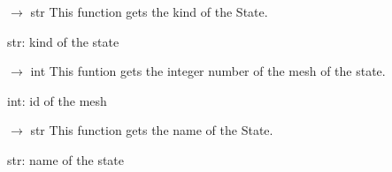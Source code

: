 \documentclass[letterpaper,10pt,english]{sphinxmanual}
\begin{document}
\begin{fulllineitems}
\begin{fulllineitems}
\begin{description}
\end{description}

\end{fulllineitems}


\begin{fulllineitems}
\label{\detokenize{scrimp:scrimp.state.State.get_kind}}
\pysigstartsignatures
\pysiglinewithargsret
{}
{}
{{ $\rightarrow$ str}}
\pysigstopsignatures
\sphinxAtStartPar
This function gets the kind of the State.
\begin{description}
\sphinxAtStartPar
str: kind of the state

\end{description}

\end{fulllineitems}


\begin{fulllineitems}
\label{\detokenize{scrimp:scrimp.state.State.get_mesh_id}}
\pysigstartsignatures
\pysiglinewithargsret
{}
{}
{{ $\rightarrow$ int}}
\pysigstopsignatures
\sphinxAtStartPar
This funtion gets the integer number of the mesh of the state.
\begin{description}
\sphinxAtStartPar
int: id of the mesh

\end{description}

\end{fulllineitems}


\begin{fulllineitems}
\label{\detokenize{scrimp:scrimp.state.State.get_name}}
\pysigstartsignatures
\pysiglinewithargsret
{}
{}
{{ $\rightarrow$ str}}
\pysigstopsignatures
\sphinxAtStartPar
This function gets the name of the State.
\begin{description}
\sphinxAtStartPar
str: name of the state

\end{description}


\end{fulllineitems}
\end{fulllineitems}
\end{document}
